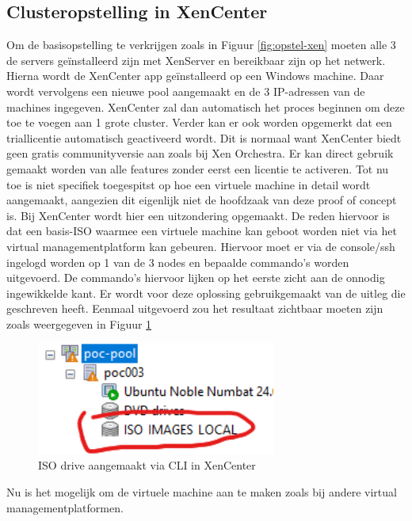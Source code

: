 \subsection{Clusteropstelling in XenCenter}
\label{sec:Clusteropstelling-Xen}
Om de basisopstelling te verkrijgen zoals in Figuur \ref{fig:opstel-xen} moeten alle 3 de servers geïnstalleerd zijn met XenServer en bereikbaar zijn op het netwerk.
Hierna wordt de XenCenter app geïnstalleerd op een Windows machine. Daar wordt vervolgens een nieuwe pool aangemaakt en de 3 IP-adressen van de machines ingegeven.
XenCenter zal dan automatisch het proces beginnen om deze toe te voegen aan 1 grote cluster. Verder kan er ook worden opgemerkt dat een triallicentie automatisch geactiveerd wordt.
Dit is normaal want XenCenter biedt geen gratis communityversie aan zoals bij Xen Orchestra. Er kan direct gebruik gemaakt worden van alle features zonder eerst een licentie te activeren.
Tot nu toe is niet specifiek toegespitst op hoe een virtuele machine in detail wordt aangemaakt, aangezien dit eigenlijk niet de hoofdzaak van deze proof of concept is.
Bij XenCenter wordt hier een uitzondering opgemaakt. De reden hiervoor is dat een basis-ISO waarmee een virtuele machine kan geboot worden niet via het virtual managementplatform kan gebeuren.
Hiervoor moet er via de console/ssh ingelogd worden op 1 van de 3 nodes en bepaalde commando's worden uitgevoerd. De commando's hiervoor lijken op het eerste zicht aan de onnodig ingewikkelde kant. 
Er wordt voor deze oplossing gebruikgemaakt van de uitleg die \textcite{rendek2018iso} geschreven heeft. Eenmaal uitgevoerd zou het resultaat zichtbaar moeten zijn zoals weergegeven in Figuur \ref{fig:iso-driv-xen}
\begin{figure}[H]
  \centering
  \includegraphics[width=0.7\textwidth]{../poc/iso-driv-xen.png}
  \caption{ISO drive aangemaakt via CLI in XenCenter}
  \label{fig:iso-driv-xen}
\end{figure}
Nu is het mogelijk om de virtuele machine aan te maken zoals bij andere virtual managementplatformen.
